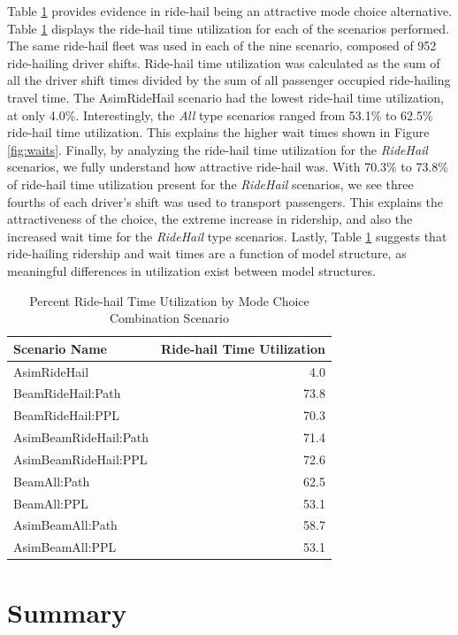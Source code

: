 \documentclass[fancy, masters]{byuthesis}
\begin{document}
Table \ref{tab:timeutil} provides evidence in ride-hail being an attractive mode choice alternative. Table \ref{tab:timeutil} displays the ride-hail time utilization for each of the scenarios performed. The same ride-hail fleet was used in each of the nine scenario, composed of 952 ride-hailing driver shifts. Ride-hail time utilization was calculated as the sum of all the driver shift times divided by the sum of all passenger occupied ride-hailing travel time. The AsimRideHail scenario had the lowest ride-hail time utilization, at only 4.0\%. Interestingly, the \emph{All} type scenarios ranged from 53.1\% to 62.5\% ride-hail time utilization. This explains the higher wait times shown in Figure \ref{fig:waits}. Finally, by analyzing the ride-hail time utilization for the \emph{RideHail} scenarios, we fully understand how attractive ride-hail was. With 70.3\% to 73.8\% of ride-hail time utilization present for the \emph{RideHail} scenarios, we see three fourths of each driver's shift was used to transport passengers. This explains the attractiveness of the choice, the extreme increase in ridership, and also the increased wait time for the \emph{RideHail} type scenarios. Lastly, Table \ref{tab:timeutil} suggests that ride-hailing ridership and wait times are a function of model structure, as meaningful differences in utilization exist between model structures.

\begin{table}

\caption[Percent Ride-hail Time Utilization]{\label{tab:timeutil}Percent Ride-hail Time Utilization by Mode Choice Combination Scenario}
\centering
\begin{tabular}[t]{lr}
\toprule
Scenario Name & Ride-hail Time Utilization\\
\midrule
AsimRideHail & 4.0\\
BeamRideHail:Path & 73.8\\
BeamRideHail:PPL & 70.3\\
AsimBeamRideHail:Path & 71.4\\
AsimBeamRideHail:PPL & 72.6\\
\addlinespace
BeamAll:Path & 62.5\\
BeamAll:PPL & 53.1\\
AsimBeamAll:Path & 58.7\\
AsimBeamAll:PPL & 53.1\\
\bottomrule
\end{tabular}
\end{table}

\hypertarget{summary-2}{%
\section{Summary}\label{summary-2}}
\end{document}
